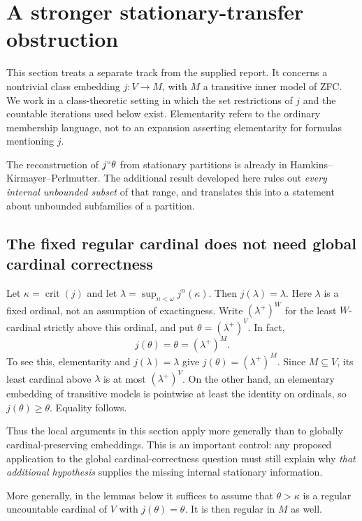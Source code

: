 \documentclass[11pt,letterpaper]{article}
\theoremstyle{definition}
\newcommand{\crit}{\operatorname{crit}}
\theoremstyle{remark}
\begin{document}
\section{A stronger stationary-transfer obstruction}\label{sec:stationary}

This section treats a separate track from the supplied report. It concerns a nontrivial class embedding $j:V\to M$, with $M$ a transitive inner model of ZFC. We work in a class-theoretic setting in which the set restrictions of $j$ and the countable iterations used below exist. Elementarity refers to the ordinary membership language, not to an expansion asserting elementarity for formulas mentioning $j$.

The reconstruction of $j``\theta$ from stationary partitions is already in Hamkins--Kirmayer--Perlmutter. The additional result developed here rules out \emph{every internal unbounded subset} of that range, and translates this into a statement about unbounded subfamilies of a partition.\cite[Theorems 11--12]{hkp}

\subsection{The fixed regular cardinal does not need global cardinal correctness}

Let $\kappa=\crit(j)$ and let $\lambda=\sup_{n<\omega}j^n(\kappa)$. Then $j(\lambda)=\lambda$. Here $\lambda$ is a fixed ordinal, not an assumption of exactingness. Write $(\lambda^+)^W$ for the least $W$-cardinal strictly above this ordinal, and put $\theta=(\lambda^+)^V$. In fact,
\begin{equation}
 j(\theta)=\theta=(\lambda^+)^M.\label{eq:theta-fixed}
\end{equation}
To see this, elementarity and $j(\lambda)=\lambda$ give $j(\theta)=(\lambda^+)^M$. Since $M\subseteq V$, its least cardinal above $\lambda$ is at most $(\lambda^+)^V$. On the other hand, an elementary embedding of transitive models is pointwise at least the identity on ordinals, so $j(\theta)\geq\theta$. Equality follows.

Thus the local arguments in this section apply more generally than to globally cardinal-preserving embeddings. This is an important control: any proposed application to the global cardinal-correctness question must still explain why \emph{that additional hypothesis} supplies the missing internal stationary information.

More generally, in the lemmas below it suffices to assume that $\theta>\kappa$ is a regular uncountable cardinal of $V$ with $j(\theta)=\theta$. It is then regular in $M$ as well.
\end{document}
